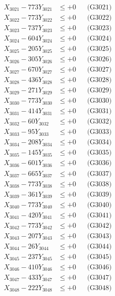 \documentclass[a4paper,10pt]{article}
\begin{document}
{\begin{align}
\allowbreak
X_{3021} - 773Y_{3021} &\leq +0 && \text{(G3021)} \\
X_{3022} - 773Y_{3022} &\leq +0 && \text{(G3022)} \\
X_{3023} - 737Y_{3023} &\leq +0 && \text{(G3023)} \\
X_{3024} - 604Y_{3024} &\leq +0 && \text{(G3024)} \\
X_{3025} - 205Y_{3025} &\leq +0 && \text{(G3025)} \\
X_{3026} - 305Y_{3026} &\leq +0 && \text{(G3026)} \\
X_{3027} - 670Y_{3027} &\leq +0 && \text{(G3027)} \\
X_{3028} - 436Y_{3028} &\leq +0 && \text{(G3028)} \\
X_{3029} - 271Y_{3029} &\leq +0 && \text{(G3029)} \\
X_{3030} - 773Y_{3030} &\leq +0 && \text{(G3030)} \\
\allowbreak
X_{3031} - 414Y_{3031} &\leq +0 && \text{(G3031)} \\
X_{3032} - 60Y_{3032} &\leq +0 && \text{(G3032)} \\
X_{3033} - 95Y_{3033} &\leq +0 && \text{(G3033)} \\
X_{3034} - 208Y_{3034} &\leq +0 && \text{(G3034)} \\
X_{3035} - 145Y_{3035} &\leq +0 && \text{(G3035)} \\
X_{3036} - 601Y_{3036} &\leq +0 && \text{(G3036)} \\
X_{3037} - 665Y_{3037} &\leq +0 && \text{(G3037)} \\
X_{3038} - 773Y_{3038} &\leq +0 && \text{(G3038)} \\
X_{3039} - 361Y_{3039} &\leq +0 && \text{(G3039)} \\
X_{3040} - 773Y_{3040} &\leq +0 && \text{(G3040)} \\
\allowbreak
X_{3041} - 420Y_{3041} &\leq +0 && \text{(G3041)} \\
X_{3042} - 773Y_{3042} &\leq +0 && \text{(G3042)} \\
X_{3043} - 207Y_{3043} &\leq +0 && \text{(G3043)} \\
X_{3044} - 26Y_{3044} &\leq +0 && \text{(G3044)} \\
X_{3045} - 237Y_{3045} &\leq +0 && \text{(G3045)} \\
X_{3046} - 410Y_{3046} &\leq +0 && \text{(G3046)} \\
X_{3047} - 433Y_{3047} &\leq +0 && \text{(G3047)} \\
X_{3048} - 222Y_{3048} &\leq +0 && \text{(G3048)} \\

\end{align}}
\end{document}
